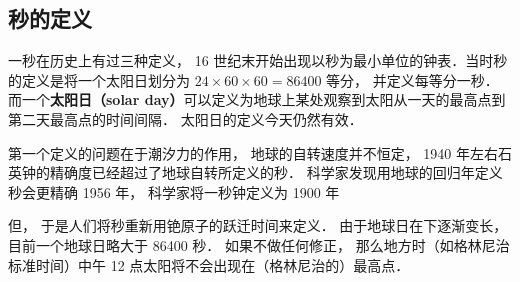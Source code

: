 
\subsection{秒的定义}
一秒在历史上有过三种定义， 16 世纪末开始出现以秒为最小单位的钟表．当时秒的定义是将一个太阳日划分为 $24\times60\times60 = 86400$ 等分， 并定义每等分一秒． 而一个\textbf{太阳日（solar day）}可以定义为地球上某处观察到太阳从一天的最高点到第二天最高点的时间间隔． 太阳日的定义今天仍然有效．

第一个定义的问题在于潮汐力的作用， 地球的自转速度并不恒定， 1940 年左右石英钟的精确度已经超过了地球自转所定义的秒． 科学家发现用地球的回归年定义秒会更精确 1956 年， 科学家将一秒钟定义为 1900 年

但， 于是人们将秒重新用铯原子的跃迁时间来定义． 由于地球日在下逐渐变长， 目前一个地球日略大于 86400 秒． 如果不做任何修正， 那么地方时（如格林尼治标准时间）中午 12 点太阳将不会出现在（格林尼治的）最高点．
